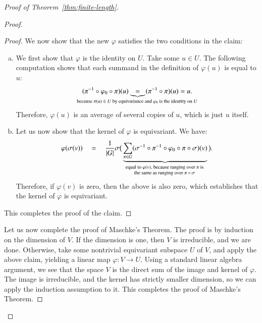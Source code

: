 \begin{proof}[Proof of Theorem~\ref{thm:finite-length}]
\begin{proof}
\begin{proof}
        We now show that the new $\varphi$ satisfies the two conditions in the claim: 
        \begin{enumerate}[(a)]
            \item  We first show that $\varphi$ is the identity on $U$. Take some $u \in U$. The following computation shows that each summand in the definition of $\varphi(u)$ is equal to $u$:
                \begin{align*}
     (\pi^{-1} \circ \varphi_0 \circ \pi)(u) 
\myunderbrace{=}{because $\pi(u) \in U$ by equivariance and $\varphi_0$ is the identity on $U$} 
     (\pi^{-1} \circ \pi)(u) = u.
    \end{align*}
    Therefore,  $\varphi(u)$ is an average of several copies of $u$, which is just $u$ itself.
    \item Let us now show that the kernel of $\varphi$ is equivariant. We have:
           \begin{align*}
            \varphi(\sigma(v)) 
         \quad = \quad 
          \frac{1}{|G|} \sigma \big(
            \myunderbrace{\sum_{\pi \in G} (\sigma^{-1} \circ \pi^{-1} \circ \varphi_0 \circ \pi \circ \sigma)(v)}
            {equal to $\varphi(v)$, because ranging over $\pi$ is \\ the same  as ranging over $\pi \circ \sigma$} 
            \big).
        \end{align*}
        Therefore, if $\varphi(v)$ is zero, then the above is also zero, which establishes that the kernel of $\varphi$ is equivariant.
        \end{enumerate}
    This completes the proof of the claim.
    \end{proof}
    Let us now complete the proof of Maschke's Theorem. The proof is by induction on the dimension of $V$. If the dimension is one, then $V$ is irreducible, and we are done. Otherwise, take some 
    nontrivial equivariant subspace $U$ of $V$, and apply the above claim, yielding a linear map $\varphi : V \to U$. Using a standard linear algebra argument, we see that the space $V$ is the direct sum of the image and kernel of $\varphi$. 
    The image is irreducible, and the kernel has strictly smaller dimension, so we can apply the induction assumption to it.  This completes the proof of Maschke's Theorem.
\end{proof}


\end{proof}
